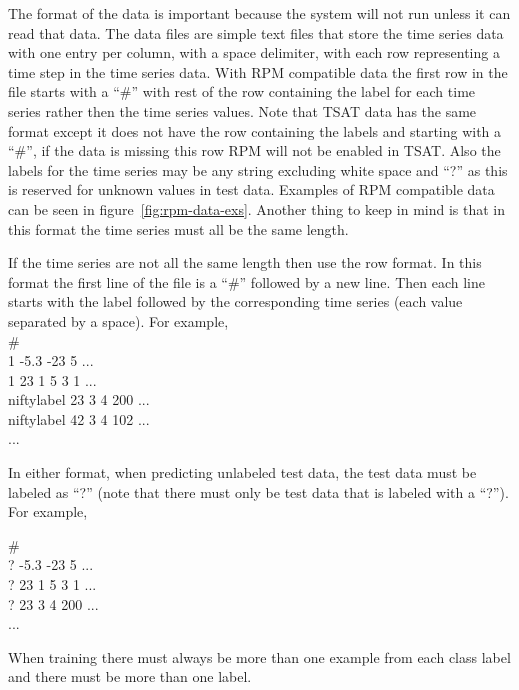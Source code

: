 \documentclass[letterpaper, 12pt]{article}
\newenvironment{allintypewriter}{\ttfamily}{\par}
\begin{document}
The format of the data is important because the system will not run unless it can read that data. The data files are simple text files that store the time series data with one entry per column, with a space delimiter, with each row representing a time step in the time series data. With RPM compatible data the first row in the file starts with a ``\#'' with rest of the row containing the label for each time series rather then the time series values. Note that TSAT data has the same format except it does not have the row containing the labels and starting with a ``\#'', if the data is missing this row RPM will not be enabled in TSAT. Also the labels for the time series may be any string excluding white space and ``?'' as this is reserved for unknown values in test data. Examples of RPM compatible data can be seen in figure~\ref{fig:rpm-data-exs}.  Another thing to keep in mind is that in this format the time series must all be the same length.

If the time series are not all the same length then use the row format.  In this format the first line of the file is a ``\#'' followed by a new line.  Then each line starts with the label followed by the corresponding time series (each value separated by a space).  For example,\\
\begin{allintypewriter}
	\noindent\#\\
	1 -5.3 -23 5 ...\\
	1 23 1 5 3 1 ...\\
	niftylabel 23 3 4 200 ...\\
	niftylabel 42 3 4 102 ...\\
	...
\end{allintypewriter}

In either format, when predicting unlabeled test data, the test data must be labeled as ``?'' (note that there must only be test data that is labeled with a ``?'').  For example,

\begin{allintypewriter}
	\noindent\#\\
	? -5.3 -23 5 ...\\
	? 23 1 5 3 1 ...\\
	? 23 3 4 200 ...\\
	...
\end{allintypewriter}

When training there must always be more than one example from each class label and there must be more than one label.
\end{document}
